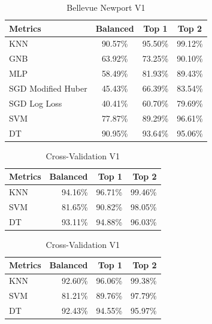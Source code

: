 \documentclass[12pt,a4paper]{article}
\begin{document}
\begin{table}[H]
    \centering
    \caption{Bellevue Newport V1}
    \label{table:1}
    \begin{tabular}{@{}lccc@{}}
        \toprule
        Metrics            & Balanced & Top 1   & Top 2   \\
        \midrule
        KNN                & 90.57\%  & 95.50\% & 99.12\% \\
        GNB                & 63.92\%  & 73.25\% & 90.10\% \\
        MLP                & 58.49\%  & 81.93\% & 89.43\% \\
        SGD Modified Huber & 45.43\%  & 66.39\% & 83.54\% \\
        SGD Log Loss       & 40.41\%  & 60.70\% & 79.69\% \\
        SVM                & 77.87\%  & 89.29\% & 96.61\% \\
        DT                 & 90.95\%  & 93.64\% & 95.06\% \\
        \bottomrule
    \end{tabular}
\end{table}

\begin{table}[H]
    \begin{minipage}{0.55\textwidth}
        \centering
        \caption{Testset V1}
        \label{table:2}
        \begin{tabular}{@{}lrrr@{}}
            \toprule
            Metrics & Balanced & Top 1   & Top 2   \\
            \midrule
            KNN     & 94.16\%  & 96.71\% & 99.46\% \\
            SVM     & 81.65\%  & 90.82\% & 98.05\% \\
            DT      & 93.11\%  & 94.88\% & 96.03\% \\
            \bottomrule
        \end{tabular}
    \end{minipage}
    \begin{minipage}{0.55\textwidth}
        \centering
        \caption{Cross-Validation V1}
        \label{table:3}
        \begin{tabular}{@{}lrrr@{}}
            \toprule
            Metrics & Balanced & Top 1   & Top 2   \\
            \midrule
            KNN     & 92.60\%  & 96.06\% & 99.38\% \\
            SVM     & 81.21\%  & 89.76\% & 97.79\% \\
            DT      & 92.43\%  & 94.55\% & 95.97\% \\
            \bottomrule
        \end{tabular}
    \end{minipage}
\end{table}
\end{document}

